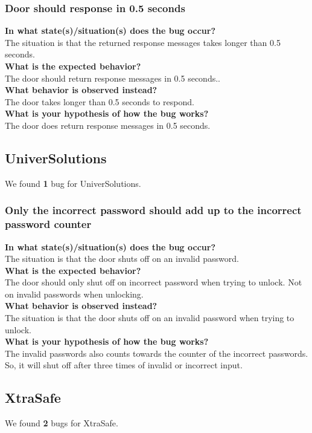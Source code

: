 \documentclass{uva-inf-article}
\begin{document}
\subsubsection{Door should response in 0.5 seconds}
\textbf{In what state(s)/situation(s) does the bug occur?}\\
The situation is that the returned response messages takes longer than 0.5 seconds.\\
\textbf{What is the expected behavior?}\\
The door should return response messages in 0.5 seconds..\\
\textbf{What behavior is observed instead?}\\
The door takes longer than 0.5 seconds to respond.\\
\textbf{What is your hypothesis of how the bug works?}\\
The door does return response messages in 0.5 seconds.


\subsection{UniverSolutions}
We found \textbf{1} bug for UniverSolutions.

\subsubsection{Only the incorrect password should add up to the incorrect password counter}
\textbf{In what state(s)/situation(s) does the bug occur?}\\
The situation is that the door shuts off on an invalid password.\\
\textbf{What is the expected behavior?}\\
The door should only shut off on incorrect password when trying to unlock. 
Not on invalid passwords when unlocking.\\
\textbf{What behavior is observed instead?}\\
The situation is that the door shuts off on an invalid password when trying to unlock.\\
\textbf{What is your hypothesis of how the bug works?}\\
The invalid passwords also counts towards the counter of the incorrect passwords. 
So, it will shut off after three times of invalid or incorrect input.


\subsection{XtraSafe}
We found \textbf{2} bugs for XtraSafe.
\end{document}
